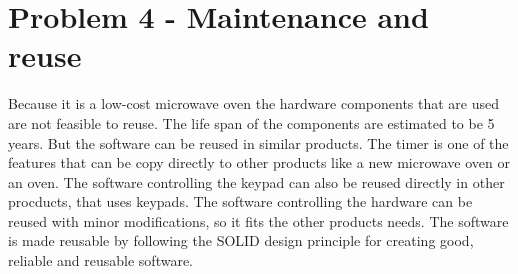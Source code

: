 \chapter{Problem 4 - Maintenance and reuse}
Because it is a low-cost microwave oven the hardware components that are used are not feasible to reuse. The life span of the components are estimated to be 5 years. But the software can be reused in similar products. The timer is one of the features that can be copy directly to other products like a new microwave oven or an oven. The software controlling the keypad can also be reused directly in other procducts, that uses keypads. The software controlling the hardware can be reused with minor modifications, so it fits the other products needs. 
The software is made reusable by following the SOLID design  principle for creating good, reliable and reusable software.  